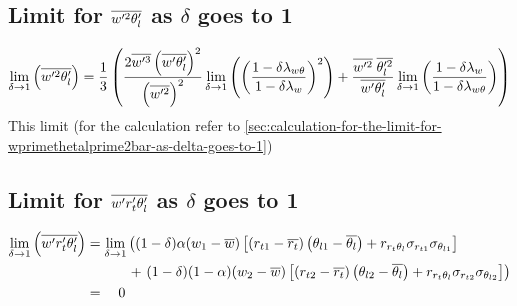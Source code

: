 \subsection{Limit for \texorpdfstring{$\overline{w'^2 \theta_l'}$}{wprimethetaltwobar} as \texorpdfstring{$\delta$}{delta} goes to 1}
\label{subsec:limit-for-wprimethetal2bar-as-delta-goes-to-1}

\begin{align}
    \label{eq:limit_wprimethetalprime2bar_delta_to_1}
    \lim_{\delta \to 1}\left(\overline{w'^2 \theta_l'}\right)
    = \frac{1}{3}\left(
    \frac{2 \overline{w'^3} \left(\overline{w' \theta_l'} \right)^2}{\left(\overline{w'^2} \right)^2} \lim_{\delta \to 1}
    \left(\left(\frac{1-\delta \lambda_{w \theta}}{1-\delta \lambda_w}\right)^2\right) +
    \frac{\overline{w'^2} \; \overline{\theta_l'^2}}{\overline{w' \theta_l'}}
    \lim_{\delta \to 1}
    \left(\frac{1-\delta \lambda_w}{1-\delta \lambda_{w \theta}}\right)
    \right)
\end{align}
This limit (for the calculation refer to \cref{sec:calculation-for-the-limit-for-wprimethetalprime2bar-as-delta-goes-to-1})

\subsection{Limit for \texorpdfstring{$\overline{w' r_t' \theta_l'}$}{wprimertprimethetalbar} as \texorpdfstring{$\delta$}{delta} goes to 1}
\label{subsec:limit-for-wprimertprimethetalbar-as-delta-goes-to-1}

\begin{align}
    \label{eq:limit_wprimertprimethetalbar_delta_to_1}
    \lim_{\delta \to 1}\left(\overline{w' r_t' \theta_l'}\right)
    &= \lim_{\delta \to 1}
    \left(
        (1 - \delta) \alpha (w_1 - \overline{w}) \left[
        \left(r_{t1} - \overline{r_t}\right)
        \left(\theta_{l1} - \overline{\theta_l}\right) +
        r_{r_t \theta_l} \sigma_{r_{t1}} \sigma_{\theta_{l1}}
        \right] \right.\nonumber\\
    &\quad\quad\quad+ \left.(1 - \delta) (1 - \alpha) (w_2 - \overline{w}) \left[
        \left(r_{t2} - \overline{r_t}\right)
        \left(\theta_{l2} - \overline{\theta_l}\right) +
        r_{r_t \theta_l} \sigma_{r_{t2}} \sigma_{\theta_{l2}}
        \right]
    \right) \nonumber\\
    &=\quad 0
\end{align}